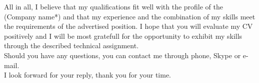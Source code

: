 \documentclass[11pt, a4paper]{awesome-cv}
\begin{document}
\begin{cvletter}
All in all, I believe that my qualifications fit well with the profile of the (Company name*) and that my experience and the combination of my skills meet the requirements of
the advertised position. I hope that you will evaluate my CV positively and I will be most
gratefull for the opportunity to exhibit my skills through the described technical assignment.\\
Should you have any questions, you can contact me through phone, Skype or e-mail.\\
I look forward for your reply, thank you for your time.

\end{cvletter}


\makeletterclosing
\end{document}
